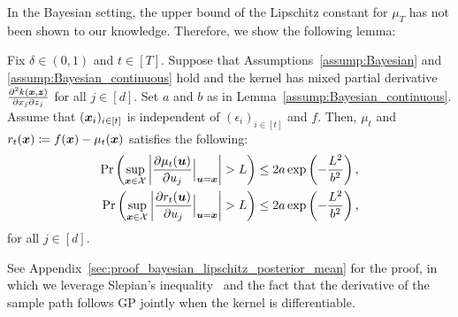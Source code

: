 In the Bayesian setting, the upper bound of the Lipschitz constant for $\mu_T$ has not been shown to our knowledge.
%
Therefore, we show the following lemma:
\begin{lemma}
    Fix $\delta \in (0, 1)$ and $t \in [T]$.
    Suppose that Assumptions~\ref{assump:Bayesian} and \ref{assump:Bayesian_continuous} hold and the kernel has mixed partial derivative $\frac{\partial^2 k(\boldsymbol{x}, \boldsymbol{z})}{ \partial x_j \partial z_j}$ for all $j \in [d]$.
    Set $a$ and $b$ as in Lemma~\ref{assump:Bayesian_continuous}.
    Assume that $(\boldsymbol{x}_i)_{i \in [t]}$ is independent of $(\epsilon_i)_{i \in [t]}$ and $f$.
    Then, $\mu_t$ and $r_t(\boldsymbol{x}) \coloneqq f(\boldsymbol{x}) - \mu_t(\boldsymbol{x})$ satisfies the following:
    \begin{align*}
        \Pr \left( \sup_{\boldsymbol{x} \in {\cal X}} \left| \frac{\partial \mu_t(\boldsymbol{u})}{\partial u_j} \Big|_{\boldsymbol{u} = \boldsymbol{x}} \right| > L \right) \leq 2a \exp \left( - \frac{L^2}{b^2} \right), \\
        \Pr \left( \sup_{\boldsymbol{x} \in {\cal X}} \left| \frac{\partial r_t(\boldsymbol{u})}{\partial u_j} \Big|_{\boldsymbol{u} = \boldsymbol{x}} \right| > L \right) \leq 2a \exp \left( - \frac{L^2}{b^2} \right), 
    \end{align*}
    for all $j \in [d]$.
    \label{lem:bayesian_lipschitz_posterior_mean}
\end{lemma}
See Appendix~\ref{sec:proof_bayesian_lipschitz_posterior_mean} for the proof, in which we leverage Slepian's inequality~\citep[Proposition~A.2.6 in][]{van1996weak} and the fact that the derivative of the sample path follows GP jointly when the kernel is differentiable.



